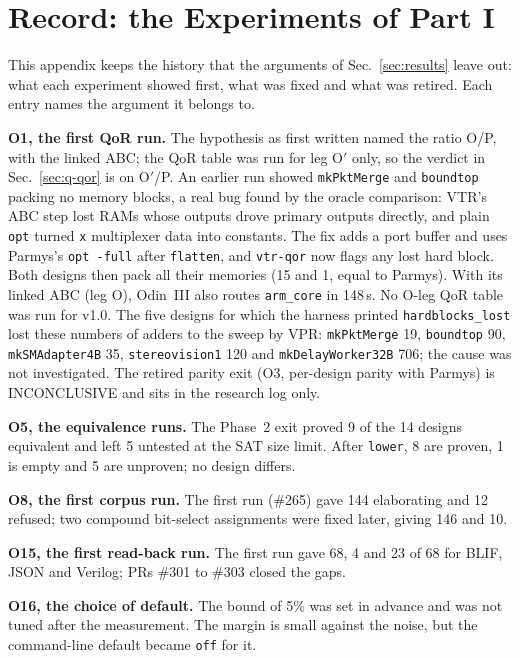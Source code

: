 \documentclass[conference]{IEEEtran}
\newcommand{\code}[1]{\texttt{#1}}
\begin{document}
\section{Record: the Experiments of Part I}
\label{sec:exprecords}

This appendix keeps the history that the arguments of Sec.~\ref{sec:results} leave out: what each experiment showed first, what was fixed and what was retired. Each entry names the argument it belongs to.

\textbf{O1, the first QoR run.} The hypothesis as first written named the ratio O/P, with the linked ABC; the QoR table was run for leg O$'$ only, so the verdict in Sec.~\ref{sec:q-qor} is on O$'$/P. An earlier run showed \code{mkPktMerge} and \code{boundtop} packing no memory blocks, a real bug found by the oracle comparison: VTR's ABC step lost RAMs whose outputs drove primary outputs directly, and plain \code{opt} turned \code{x} multiplexer data into constants. The fix adds a port buffer and uses Parmys's \code{opt -full} after \code{flatten}, and \code{vtr-qor} now flags any lost hard block. Both designs then pack all their memories (15 and 1, equal to Parmys). With its linked ABC (leg O), Odin~III also routes \code{arm\_core} in 148\,s. No O-leg QoR table was run for v1.0. The five designs for which the harness printed \code{hardblocks\_lost} lost these numbers of adders to the sweep by VPR: \code{mkPktMerge} 19, \code{boundtop} 90, \code{mkSMAdapter4B} 35, \code{stereovision1} 120 and \code{mkDelayWorker32B} 706; the cause was not investigated. The retired parity exit (O3, per-design parity with Parmys) is INCONCLUSIVE and sits in the research log only.

\textbf{O5, the equivalence runs.} The Phase~2 exit proved 9 of the 14 designs equivalent and left 5 untested at the SAT size limit. After \code{lower}, 8 are proven, 1 is empty and 5 are unproven; no design differs.

\textbf{O8, the first corpus run.} The first run (\#265) gave 144 elaborating and 12 refused; two compound bit-select assignments were fixed later, giving 146 and 10.

\textbf{O15, the first read-back run.} The first run gave 68, 4 and 23 of 68 for BLIF, JSON and Verilog; PRs \#301 to \#303 closed the gaps.

\textbf{O16, the choice of default.} The bound of 5\% was set in advance and was not tuned after the measurement. The margin is small against the noise, but the command-line default became \code{off} for it.
\end{document}
